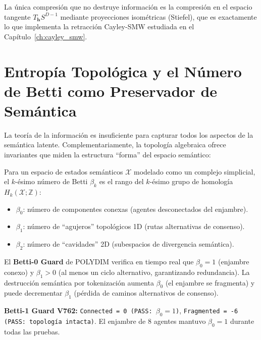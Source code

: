 La única compresión que no destruye información es la compresión en el espacio
tangente $T_{\mathbf{h}} S^{D-1}$ mediante proyecciones isométricas (Stiefel),
que es exactamente lo que implementa la retracción Cayley-SMW estudiada en el
Capítulo~\ref{ch:cayley_smw}.

\section{Entropía Topológica y el Número de Betti como Preservador de Semántica}

La teoría de la información es insuficiente para capturar todos los aspectos
de la semántica latente. Complementariamente, la topología algebraica ofrece
invariantes que miden la estructura ``forma'' del espacio semántico:

\begin{definition}
\label{def:betti}
Para un espacio de estados semánticos $\mathcal{X}$ modelado como un complejo
simplicial, el $k$-ésimo número de Betti $\beta_k$ es el rango del $k$-ésimo
grupo de homología $H_k(\mathcal{X}; \mathbb{Z})$:
\begin{itemize}
\item $\beta_0$: número de componentes conexas (agentes desconectados del enjambre).
\item $\beta_1$: número de ``agujeros'' topológicos 1D (rutas alternativas de consenso).
\item $\beta_2$: número de ``cavidades'' 2D (subespacios de divergencia semántica).
\end{itemize}
\end{definition}

El \textbf{Betti-0 Guard} de POLYDIM verifica en tiempo real que $\beta_0 = 1$
(enjambre conexo) y $\beta_1 > 0$ (al menos un ciclo alternativo, garantizando
redundancia). La destrucción semántica por tokenización aumenta $\beta_0$ (el
enjambre se fragmenta) y puede decrementar $\beta_1$ (pérdida de caminos
alternativos de consenso).

\begin{certifiedbox}
\textbf{Betti-1 Guard V762:}
\texttt{Connected = 0 (PASS: $\beta_0 = 1$)},
\texttt{Fragmented = -6 (PASS: topología intacta)}.
El enjambre de 8 agentes mantuvo $\beta_0 = 1$ durante todas las pruebas.
\end{certifiedbox}
